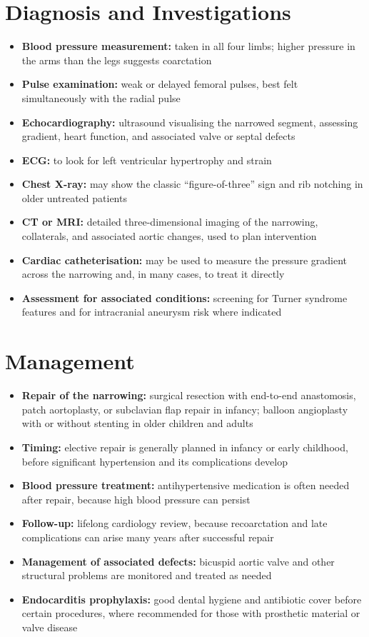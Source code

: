 \section*{Diagnosis and Investigations}
\begin{itemize}
    \item \textbf{Blood pressure measurement:} taken in all four limbs; higher pressure in the arms than the legs suggests coarctation
    \item \textbf{Pulse examination:} weak or delayed femoral pulses, best felt simultaneously with the radial pulse
    \item \textbf{Echocardiography:} ultrasound visualising the narrowed segment, assessing gradient, heart function, and associated valve or septal defects
    \item \textbf{ECG:} to look for left ventricular hypertrophy and strain
    \item \textbf{Chest X-ray:} may show the classic ``figure-of-three'' sign and rib notching in older untreated patients
    \item \textbf{CT or MRI:} detailed three-dimensional imaging of the narrowing, collaterals, and associated aortic changes, used to plan intervention
    \item \textbf{Cardiac catheterisation:} may be used to measure the pressure gradient across the narrowing and, in many cases, to treat it directly
    \item \textbf{Assessment for associated conditions:} screening for Turner syndrome features and for intracranial aneurysm risk where indicated
\end{itemize}

\section*{Management}
\begin{itemize}
    \item \textbf{Repair of the narrowing:} surgical resection with end-to-end anastomosis, patch aortoplasty, or subclavian flap repair in infancy; balloon angioplasty with or without stenting in older children and adults
    \item \textbf{Timing:} elective repair is generally planned in infancy or early childhood, before significant hypertension and its complications develop
    \item \textbf{Blood pressure treatment:} antihypertensive medication is often needed after repair, because high blood pressure can persist
    \item \textbf{Follow-up:} lifelong cardiology review, because recoarctation and late complications can arise many years after successful repair
    \item \textbf{Management of associated defects:} bicuspid aortic valve and other structural problems are monitored and treated as needed
    \item \textbf{Endocarditis prophylaxis:} good dental hygiene and antibiotic cover before certain procedures, where recommended for those with prosthetic material or valve disease
\end{itemize}

